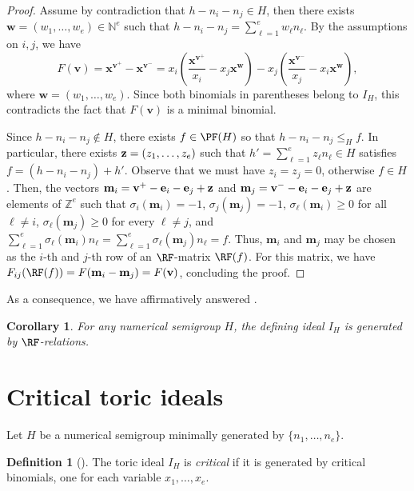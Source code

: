 \documentclass[11pt,twoside]{amsart}
\newcommand{\Z}{\mathbb Z}
\newcommand{\N}{\mathbb N}
\def\bv{{\mathbf v}}
\def\bw{{\mathbf w}}
\def\bx{{\mathbf x}}
\def\be{{\mathbf e}}
\def\bm{{\mathbf m}}
\newtheorem{cor}[Theorem]{Corollary}
\theoremstyle{definition}
\newtheorem{defn}[Theorem]{Definition}
\numberwithin{equation}{section}
\begin{document}
\begin{proof} 
Assume by contradiction that $h - n_i - n_j \in H$,
then there exists $\bw=(w_1,\ldots,w_e)\in \N^e$ such that 
$h -n_i - n_j = \sum_{\ell=1}^e w_\ell n_\ell$.
By the assumptions on $i,j$, we have
\[
F(\bv) = 
\bx^{\bv^+}-\bx^{\bv^-}
=
x_i \left( \frac{\bx^{\bv^+}}{x_i} - x_j \bx^\bw\right) 
- x_j \left(\frac{\bx^{\bv^-}}{x_j}-x_i\bx^{\bw}\right),
\] 
where $\bw=(w_1,\ldots,w_e)$.
Since both binomials in parentheses belong to $I_H$, this contradicts  the fact that $F(\bv)$ is a minimal binomial.

Since $h - n_i - n_j \notin H$, there exists $f \in \PF(H)$ so that 
$h - n_i - n_j \leq_H f$.
In particular, there exists ${\bf z} = (z_1,\ldots,z_e)$ such that
 $h' = \sum_{\ell=1}^e z_\ell n_\ell\in H$ satisfies
$f = (h - n_i - n_j) + h'$.
Observe that we must have $z_i=z_j =0$,
otherwise $f \in H$.
Then, 
the vectors $\bm_i=\bv^+ - \be_i - \be_j + {\bf z}$ and $\bm_j=\bv^- -\be_i-\be_j+{\bf z}$ are elements of $\Z^e$ such that $\sigma_i(\bm_i)=-1$, $\sigma_j(\bm_j)=-1$, 
$\sigma_\ell(\bm_i) \ge 0$ for all $\ell \ne i$,  $\sigma_\ell(\bm_j) \ge 0$ for every $\ell \ne j$, and $\sum_{\ell=1}^e \sigma_\ell(\bm_i)n_\ell = \sum_{\ell=1}^e \sigma_\ell(\bm_j)n_\ell = f$.
Thus, $\bm_i$ and $\bm_j$ may be chosen as the $i$-th and $j$-th row of an $\RF$-matrix $\RF(f)$.
For this matrix, we have  $F_{ij}(\RF(f)) = F(\bm_i-\bm_j)=F(\bv)$, concluding the proof.
\end{proof}

As a consequence, we have affirmatively answered 
 \cite[Question 3.6]{HW}.

\begin{cor}
For any numerical semigroup $H$,
the defining ideal  $I_H$ is generated by $\RF$-relations.
\end{cor}


\section{Critical toric ideals}\label{SectionCriticalIdeals}



Let $H$ 
be a numerical semigroup minimally generated by $\{n_1, \ldots, n_e\}$.


\begin{defn}[\cite{El83}]\label{DefCriticalToric}
The toric ideal $I_H$ is {\em critical} if it is generated by critical binomials, one for each variable $x_1, \ldots, x_e$.
\end{defn}
\end{document}
